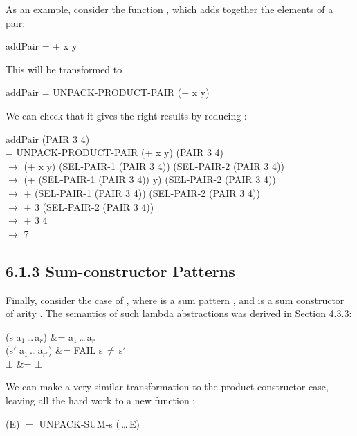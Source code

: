 As an example, consider the function , which adds together the
elements of a pair:
\begin{mlcoded}
	addPair =  + x y
\end{mlcoded}
This will be transformed to
\begin{mlcoded}
	addPair = UNPACK-PRODUCT-PAIR (+ x y)
\end{mlcoded}
We can check that it gives the right results by reducing :
\begin{mlcoded}
	addPair (PAIR 3 4)\\
	\phantom{--}= UNPACK-PRODUCT-PAIR (+ x y) (PAIR 3 4) \\
	$\rightarrow$ (+ x y) (SEL-PAIR-1 (PAIR 3 4)) (SEL-PAIR-2 (PAIR 3 4)) \\ 
	$\rightarrow$ (+ (SEL-PAIR-1 (PAIR 3 4)) y) (SEL-PAIR-2 (PAIR 3 4)) \\
	$\rightarrow$ + (SEL-PAIR-1 (PAIR 3 4)) (SEL-PAIR-2 (PAIR 3 4)) \\
	$\rightarrow$ + 3 (SEL-PAIR-2 (PAIR 3 4)) \\  
	$\rightarrow$ + 3 4 \\
	$\rightarrow$ 7
\end{mlcoded}

\subsection{6.1.3 Sum-constructor Patterns}

Finally, consider the case of , where  is a sum pattern , and
 is a sum constructor of arity . The semantics of such lambda abstractions
was derived in Section 4.3.3:
\begin{letalign}
	 (s a$_1$\,\ldots\,a$_r$) 
	&=  a$_1$\,\ldots\,a$_r$ \\
	 (s$'$ a$_1$\,\ldots\,a$_{r'}$) 
	&= FAIL  s$\,\neq\,$s$'$ \\
	 $\bot$
	&= $\bot$ \\
\end{letalign}


We can make a very similar transformation to the product-constructor case,
leaving all the hard work to a new function :
\begin{mlcoded}
	(E) $=$ UNPACK-SUM-s (\,\ldots\,E)
\end{mlcoded}


